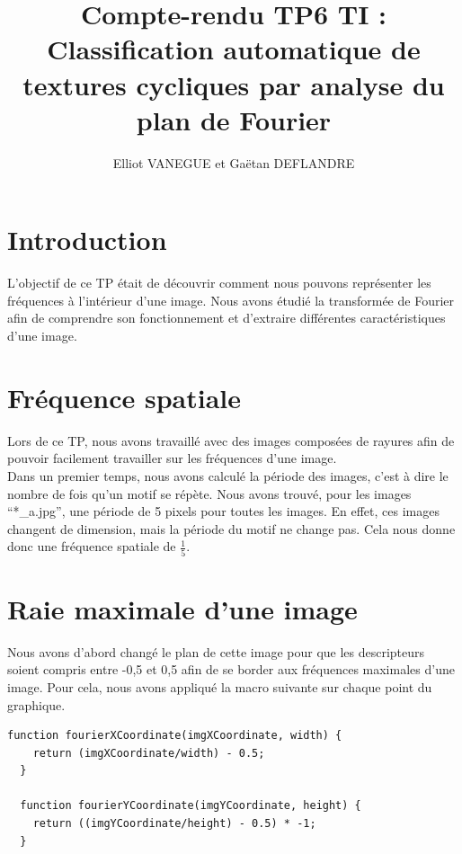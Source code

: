 \documentclass[a4paper,11pt]{article}
\title{Compte-rendu TP6 TI : Classification automatique de textures cycliques par analyse du plan de Fourier}
\author{Elliot VANEGUE et Gaëtan DEFLANDRE}
\begin{document}


  \maketitle
  
  \mbox{}
  \newpage
  \clearpage
  
  \section*{Introduction}
  L'objectif de ce TP était de découvrir comment nous pouvons représenter les fréquences à l'intérieur 
  d'une image. Nous avons étudié la transformée de Fourier afin de comprendre son fonctionnement et 
  d'extraire différentes caractéristiques d'une image.
  
  \section{Fréquence spatiale}
  Lors de ce TP, nous avons travaillé avec des images composées de rayures afin de pouvoir
  facilement travailler sur les fréquences d'une image.\\
  
  Dans un premier temps, nous avons calculé la période des images, c'est à dire le nombre de fois 
  qu'un motif se répète. Nous avons trouvé, pour les images \enquote{*\_a.jpg}, une période de 5 pixels pour toutes les images. En effet,
  ces images changent de dimension, mais la période du motif ne change pas. Cela nous donne donc
  une fréquence spatiale de $\frac{1}{5}$.
  
  \section{Raie maximale d'une image}
  
  Nous avons d'abord changé le plan de cette image pour que les descripteurs soient compris entre -0,5
  et 0,5 afin de se border aux fréquences maximales d'une image. Pour cela, nous avons appliqué la 
  macro suivante sur chaque point du graphique.
  
  \begin{lstlisting}[caption=Fonctions de passage aux coordonnées dans le plan de Fourier]
  function fourierXCoordinate(imgXCoordinate, width) {
    return (imgXCoordinate/width) - 0.5;
  }

  function fourierYCoordinate(imgYCoordinate, height) {
    return ((imgYCoordinate/height) - 0.5) * -1;
  }
  \end{lstlisting}
  
\end{document}

